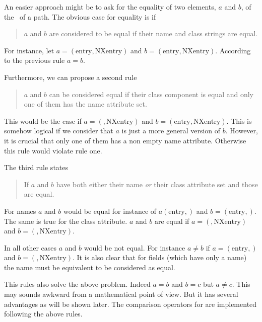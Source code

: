 An easier approach might be to ask for the equality of two elements, $a$ and
$b$, of the 
\osection\ of a path. The obvious case for equality is if 
\begin{quote}
    $a$ and $b$ are considered to be equal if their name and class strings are
    equal. 
\end{quote}
For instance, let $a=(\mathrm{entry},\mathrm{NXentry})$ and
$b=(\mathrm{entry},\mathrm{NXentry})$. According to the previous rule $a=b$.

Furthermore, we can propose a second rule
\begin{quote}
    $a$ and $b$ can be considered equal if their class component is equal 
    and only one of them has the name attribute set. 
\end{quote}
This would be the case if $a=(,\mathrm{NXentry})$ and
$b=(\mathrm{entry},\mathrm{NXentry})$. This is somehow logical if we consider
that $a$ is just a more general version of $b$. However, it is crucial that only
one of them has a non empty name attribute. Otherwise this rule would violate
rule one.

The third rule states
\begin{quote}
    If $a$ and $b$ have both either their name \emph{or} their class attribute
    set and those are equal.
\end{quote}
For names $a$ and $b$ would be equal for instance of $a(\mathrm{entry},)$ and 
$b=(\mathrm{entry},)$. The same is true for the class attribute. 
$a$ and $b$ are equal if $a=(,\mathrm{NXentry})$ and $b=(,\mathrm{NXentry})$.

In all other cases $a$ and $b$ would be not equal. For instance $a\not=b$ if 
$a=(\mathrm{entry},)$ and $b=(,\mathrm{NXentry})$. It is also clear that for
fields (which have only a name) the name must be equivalent to be considered as
equal. 

This rules also solve the above problem. Indeed $a=b$ and $b=c$ but $a\not=c$. 
This may sounds awkward from a mathematical point of view. But it has several
advantages as will be shown later.
The comparison operators for  are implemented
following the above rules.

